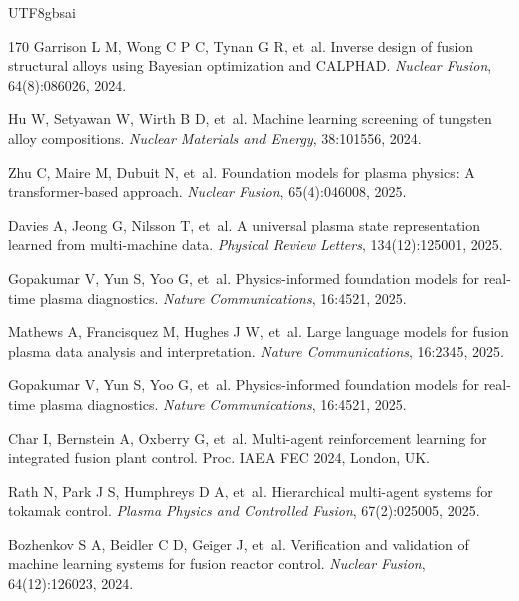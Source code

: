\documentclass[12pt,a4paper]{article}
\begin{document}
\begin{CJK}{UTF8}{gbsai}
\begin{thebibliography}{170}
Garrison L M, Wong C P C, Tynan G R, et~al.
\newblock Inverse design of fusion structural alloys using Bayesian optimization and CALPHAD.
\newblock \textit{Nuclear Fusion}, 64(8):086026, 2024.

Hu W, Setyawan W, Wirth B D, et~al.
\newblock Machine learning screening of tungsten alloy compositions.
\newblock \textit{Nuclear Materials and Energy}, 38:101556, 2024.

Zhu C, Maire M, Dubuit N, et~al.
\newblock Foundation models for plasma physics: A transformer-based approach.
\newblock \textit{Nuclear Fusion}, 65(4):046008, 2025.

Davies A, Jeong G, Nilsson T, et~al.
\newblock A universal plasma state representation learned from multi-machine data.
\newblock \textit{Physical Review Letters}, 134(12):125001, 2025.

Gopakumar V, Yun S, Yoo G, et~al.
\newblock Physics-informed foundation models for real-time plasma diagnostics.
\newblock \textit{Nature Communications}, 16:4521, 2025.

Mathews A, Francisquez M, Hughes J W, et~al.
\newblock Large language models for fusion plasma data analysis and interpretation.
\newblock \textit{Nature Communications}, 16:2345, 2025.

Gopakumar V, Yun S, Yoo G, et~al.
\newblock Physics-informed foundation models for real-time plasma diagnostics.
\newblock \textit{Nature Communications}, 16:4521, 2025.

Char I, Bernstein A, Oxberry G, et~al.
\newblock Multi-agent reinforcement learning for integrated fusion plant control.
\newblock Proc. IAEA FEC 2024, London, UK.

Rath N, Park J S, Humphreys D A, et~al.
\newblock Hierarchical multi-agent systems for tokamak control.
\newblock \textit{Plasma Physics and Controlled Fusion}, 67(2):025005, 2025.

Bozhenkov S A, Beidler C D, Geiger J, et~al.
\newblock Verification and validation of machine learning systems for fusion reactor control.
\newblock \textit{Nuclear Fusion}, 64(12):126023, 2024.


\end{thebibliography}
\end{CJK}
\end{document}
